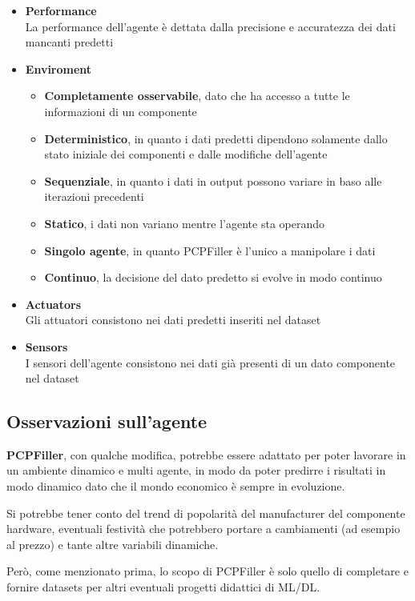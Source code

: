 \documentclass[12pt]{report}
\begin{document}
\begin{itemize}
	\item\textbf{Performance}\\
		La performance dell'agente è dettata dalla precisione e accuratezza dei dati mancanti predetti
	\item\textbf{Enviroment}
		\begin{itemize}
			\item \textbf{Completamente osservabile}, dato che ha accesso a tutte le informazioni di un componente
			\item \textbf{Deterministico}, in quanto i dati predetti dipendono solamente dallo stato iniziale dei componenti e dalle modifiche dell'agente
			\item \textbf{Sequenziale}, in quanto i dati in output possono variare in baso alle iterazioni precedenti
			\item \textbf{Statico}, i dati non variano mentre l'agente sta operando
			\item \textbf{Singolo agente}, in quanto PCPFiller è l'unico a manipolare i dati
			\item \textbf{Continuo}, la decisione del dato predetto si evolve in modo continuo
		\end{itemize}
	\item\textbf{Actuators}\\
		Gli attuatori consistono nei dati predetti inseriti nel dataset
	\item\textbf{Sensors}\\
		I sensori dell'agente consistono nei dati già presenti di un dato componente nel dataset
\end{itemize}

\subsection{Osservazioni sull'agente}

\textbf{PCPFiller}, con qualche modifica, potrebbe essere adattato per poter lavorare in un ambiente
dinamico e multi agente, in modo da poter predirre i risultati in modo dinamico dato che il mondo
economico è sempre in evoluzione.

Si potrebbe tener conto del trend di popolarità del manufacturer del componente
hardware, eventuali festività che potrebbero portare a cambiamenti (ad esempio al prezzo) e tante
altre variabili dinamiche.

Però, come menzionato prima, lo scopo di PCPFiller è solo quello di completare e fornire datasets per
altri eventuali progetti didattici di ML/DL.
\end{document}

